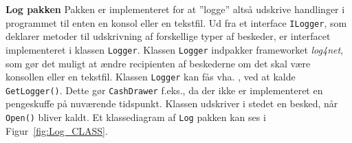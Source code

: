 \textbf{Log pakken}
\newline
Pakken er implementeret for at ''logge'' altså udskrive handlinger i programmet til enten en konsol eller en tekstfil.
Ud fra et interface \texttt{ILogger}, som deklarer metoder til udskrivning af forskellige typer af beskeder, er interfacet implementeret i klassen \texttt{Logger}.
Klassen \texttt{Logger} indpakker frameworket \textit{log4net}, som gør det muligt at ændre recipienten af beskederne om det skal være konsollen eller en tekstfil. Klassen \texttt{Logger} kan fås vha. , ved at kalde \texttt{GetLogger()}. Dette gør \texttt{CashDrawer} f.eks., da der ikke er implementeret en pengeskuffe på nuværende tidspunkt. Klassen udskriver i stedet en besked, når \texttt{Open()} bliver kaldt. Et klassediagram af \texttt{Log} pakken kan ses i Figur~\ref{fig:Log_CLASS}.

